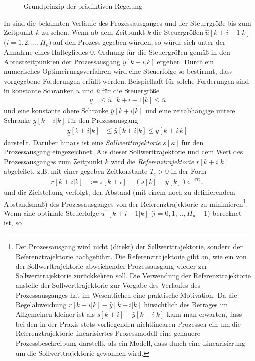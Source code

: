 \begin{figure}[htb]
	\centering
	
	\caption{Grundprinzip der prädiktiven Regelung}
	\label{fig:kap_4_grundprinzip_mpr}
\end{figure}
In  sind die bekannten Verläufe des Prozessausganges und der Steuergröße bis zum Zeitpunkt $k$ zu sehen. Wenn ab dem Zeitpunkt $k$ die Steuergrößen
$\hat{u}[k+i-1|k]$ ($i=1,2,\ldots,H_p$) auf den Prozess gegeben würden, so würde sich unter der Annahme eines Haltegliedes 0. Ordnung für die Steuergrößen gemäß
 in den Abtastzeitpunkten der Prozessausgang $\hat{y}[k+i|k]$ ergeben. Durch ein numerisches Optimeirungsverfahren wird eine Steuerfolge so bestimmt, dass
vorgegebene Forderungen erfüllt werden. Beispielhaft für solche Forderungen sind in  konstante Schranken $\underline{u}$ und $\overline{u}$ für die
Steuergröße
\begin{align}
	\underline{u}&\le \hat{u}[k+i-1|k]\le \overline{u} \label{eqn:kap_4_ugnb_u}
\end{align}
und eine konstante obere Schranke $\overline{y}[k+i|k]$ und eine zeitabhängige untere Schranke $\underline{y}[k+i|k]$ für den Prozessausgang
\begin{align}
	\underline{y}[k+i|k]&\le \hat{y}[k+i|k]\le\overline{y}[k+i|k] \label{eqn:kap_4_ugnb_y}
\end{align}
darstellt. Darüber hinaus ist eine \textit{Sollwerttrajektorie} $s[\kappa]$ für den Prozessausgang eingezeichnet. Aus dieser Sollwerttrajektorie und
dem Wert des Prozessausganges zum Zeitpunkt $k$ wird die \textit{Referenztrajektorie} $r[k+i|k]$ abgeleitet, z.B. mit einer gegeben Zeitkonstante $T_c>0$ in der Form
\begin{align}
	r[k+i|k] & := s[k+i]-(s[k]-y[k])e^{-iT_c},
\end{align}
und die Zielstellung verfolgt, den Abstand (mit einem noch zu definierendem Abstandsmaß) des Prozessausganges von der Referenztrajektorie zu minimieren\footnote{Der Prozessausgang wird
nicht (direkt) der Sollwerttrajektorie, sondern der Referenztrajektorie nachgeführt. Die Referenztrajektorie gibt an, wie ein von der Sollwerttrajektorie abweichender Prozessausgang
wieder zur Sollwerttrajektorie zurückkehren soll. Die Verwendung der Referenztrajektorie anstelle der Sollwerttrajektorie zur Vorgabe des Verlaufes des Prozessausganges hat im
Wesentlichen eine praktische Motivation: Da die Regelabweichung $r[k+i|k]-\hat{y}[k+i|k]$ hinsichtlich des Betrages im Allgemeinen kleiner ist als $s[k+i]-\hat{y}[k+i|k]$ kann man
erwarten, dass bei den in der Praxis stets vorliegenden nichtlinearen Prozessen ein um die Referenztrajektorie linearisiertes Prozessmodell eine genauere Prozessbeschreibung darstellt,
als ein Modell, dass durch eine Linearisierung um die Sollwerttrajektorie gewonnen wird.}. Wenn eine optimale Steuerfolge $u^{\ast}[k+i-1|k]$ ($i=0,1,\ldots,H_u-1$) berechnet ist, so
